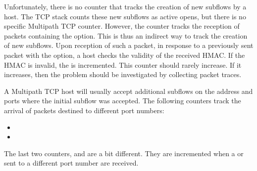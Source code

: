 \documentclass[letterpaper,10pt,english]{sphinxmanual}
\begin{document}
\sphinxAtStartPar
Unfortunately, there is no counter that tracks the creation of new subflows
by a host. The TCP stack counts these new subflows as active opens, but
there is no specific Multipath TCP counter. However, the
 counter tracks the reception of 
packets containing the  option. This is thus an indirect
way to track the creation of new subflows. Upon reception of such a
packet, in response to a previously sent  packet with the 
option, a host checks the validity of the received HMAC. If the HMAC is
invalid, the  is incremented. This counter
should rarely increase. If it increases, then the problem should be
investigated by collecting packet traces.
\def\sphinxLiteralBlockLabel{\label{\detokenize{nstat-mptcp:id9}}}
\begin{sphinxVerbatim}[commandchars=\\\{\}]
\end{sphinxVerbatim}

\sphinxAtStartPar
A Multipath TCP host will usually accept additional subflows on the address
and ports where the initial subflow was accepted. The following counters
track the arrival of packets destined to different port numbers:
\begin{itemize}
\item {} 
\sphinxAtStartPar
{}

\item {} 
\sphinxAtStartPar
{}

\end{itemize}

\sphinxAtStartPar
The last two counters,  and
 are a bit different. They are incremented when
a  or  sent to a different port number are received.
\end{document}
